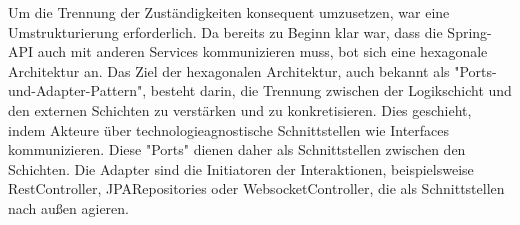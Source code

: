 Um die Trennung der Zuständigkeiten konsequent umzusetzen, war eine Umstrukturierung erforderlich. Da bereits zu Beginn klar war, dass die Spring-API auch mit anderen Services kommunizieren muss, bot sich eine hexagonale Architektur an. 
Das Ziel der hexagonalen Architektur, auch bekannt als "Ports-und-Adapter-Pattern", besteht darin, die Trennung zwischen der Logikschicht und den externen Schichten zu verstärken und zu konkretisieren. Dies geschieht, indem Akteure über 
technologieagnostische Schnittstellen wie Interfaces kommunizieren. Diese "Ports" dienen daher als Schnittstellen zwischen den Schichten. Die Adapter sind die Initiatoren der Interaktionen, beispielsweise RestController, JPARepositories oder 
WebsocketController, die als Schnittstellen nach außen agieren.



